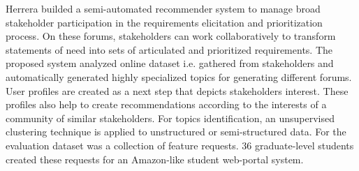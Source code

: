 Herrera \etal \cite{Castro-Herrera:2009} builded a semi-automated recommender system
to manage broad stakeholder participation in the requirements elicitation
and prioritization process. On these forums, stakeholders can work collaboratively to transform statements of
need into sets of articulated and prioritized requirements. The proposed system analyzed online dataset i.e. gathered
from stakeholders and automatically generated highly specialized topics for generating different forums. User profiles are created as a next step that depicts stakeholders interest. These profiles also help to create recommendations according to the interests of a community of similar stakeholders. For topics
identification, an unsupervised clustering technique is applied to unstructured or semi-structured data. 
For the evaluation dataset was a collection of feature requests. 36 graduate-level students created these requests for an Amazon-like student web-portal system.\\





